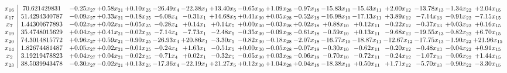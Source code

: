 \documentclass[9pt]{article}
\begin{document}
 \[\begin{array}{c| c c@{\hskip 2pt} c@{\hskip 2pt} c@{\hskip 2pt} c@{\hskip 2pt} c@{\hskip 2pt} c@{\hskip 2pt} c@{\hskip 2pt} c@{\hskip 2pt} c@{\hskip 2pt} c@{\hskip 2pt} c@{\hskip 2pt} c@{\hskip 2pt} c@{\hskip 2pt} c@{\hskip 2pt} c@{\hskip 2pt} }
 x_{16}   &  70.621429831 & -0.25 x_{27} & +  0.58 x_{21} & +  0.10 x_{25} & -26.49 x_{4} & -22.38 x_{1} & + 13.40 x_{5} & -0.65 x_{30} & +  1.09 x_{28} & -0.97 x_{18} & -15.83 x_{10} & -15.43 x_{11} & +  2.00 x_{12} & -13.78 x_{13} & -1.34 x_{22} & +  2.04 x_{15}\\
 x_{17}   &  51.4294340787 & -0.09 x_{27} & +  0.33 x_{21} & -0.18 x_{25} & -6.08 x_{4} & -0.31 x_{1} & + 14.68 x_{5} & +  0.41 x_{30} & +  0.05 x_{28} & -0.52 x_{18} & -16.98 x_{10} & -17.13 x_{11} & +  3.89 x_{12} & -7.14 x_{13} & -0.91 x_{22} & -7.15 x_{15}\\
 x_{7}   &  1.44300677893 & -0.02 x_{27} & +  0.02 x_{21} & -0.05 x_{25} & -0.28 x_{4} & +  0.14 x_{1} & +  0.14 x_{5} & +  0.00 x_{30} & -0.03 x_{28} & +  0.02 x_{18} & +  0.88 x_{10} & +  0.12 x_{11} & -0.22 x_{12} & -0.37 x_{13} & +  0.03 x_{22} & +  0.16 x_{15}\\
 x_{19}   &  35.4748015629 & +  0.04 x_{27} & +  0.41 x_{21} & -0.02 x_{25} & -7.14 x_{4} & -7.73 x_{1} & -2.48 x_{5} & -0.35 x_{30} & -0.09 x_{28} & -0.61 x_{18} & -0.59 x_{10} & +  0.13 x_{11} & -9.68 x_{12} & -19.55 x_{13} & -0.82 x_{22} & +  6.70 x_{15}\\
 x_{20}   &  74.3014815772 & +  0.96 x_{27} & +  0.59 x_{21} & -0.90 x_{25} & -26.93 x_{4} & + 20.86 x_{1} & -3.30 x_{5} & -0.82 x_{30} & -0.18 x_{28} & -2.07 x_{18} & -16.77 x_{10} & -18.87 x_{11} & -12.67 x_{12} & -17.75 x_{13} & -1.90 x_{22} & + 21.96 x_{15}\\
 x_{14}   &  1.82674481487 & +  0.05 x_{27} & +  0.02 x_{21} & -0.01 x_{25} & -0.24 x_{4} & +  1.63 x_{1} & -0.51 x_{5} & +  0.00 x_{30} & -0.05 x_{28} & -0.07 x_{18} & -0.30 x_{10} & -0.62 x_{11} & -0.20 x_{12} & -0.48 x_{13} & -0.04 x_{22} & +  0.91 x_{15}\\
 x_{2}   &  3.19219478823 & +  0.04 x_{27} & +  0.04 x_{21} & -0.02 x_{25} & -0.71 x_{4} & +  0.02 x_{1} & -0.32 x_{5} & -0.05 x_{30} & +  0.03 x_{28} & -0.06 x_{18} & -0.70 x_{10} & -0.72 x_{11} & -0.24 x_{12} & -1.07 x_{13} & -0.06 x_{22} & +  1.44 x_{15}\\
 x_{23}   &  38.5039943478 & -0.30 x_{27} & -0.02 x_{21} & +  0.13 x_{25} & -17.36 x_{4} & -22.19 x_{1} & + 21.27 x_{5} & +  0.12 x_{30} & +  1.04 x_{28} & +  0.04 x_{18} & -18.38 x_{10} & +  0.50 x_{11} & +  1.71 x_{12} & -5.70 x_{13} & -0.90 x_{22} & -3.30 x_{15}\\

\end{array}\]
\end{document}
